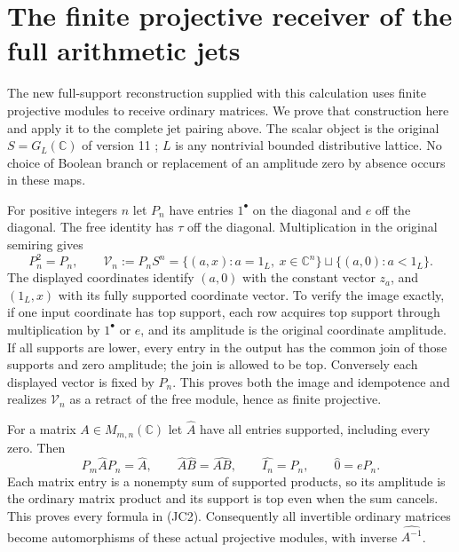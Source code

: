\documentclass[11pt,a4paper]{article}
\theoremstyle{definition}\newtheorem{definition}[theorem]{Definition}
\begin{document}
\section{The finite projective receiver of the full arithmetic jets}
\label{sec:projective-jet-receiver}

The new full-support reconstruction supplied with this calculation uses
finite projective modules to receive ordinary matrices. We prove that
construction here and apply it to the complete jet pairing above.
The scalar object is the original $S=G_L(\mathbb C)$ of version 11
\cite{support}; $L$ is any nontrivial bounded distributive lattice.
No choice of Boolean branch or replacement of an amplitude zero by
absence occurs in these maps.

For positive integers $n$ let $P_n$ have entries $1^\bullet$ on
the diagonal and $e$ off the diagonal. The free identity has $\tau$
off the diagonal. Multiplication in the original semiring gives
\[
 P_n^2=P_n,\qquad
 \mathcal V_n:=P_nS^n
 =\{(a,x):a=1_L,\ x\in\mathbb C^n\}
       \sqcup\{(a,0):a<1_L\}.
 \tag{JC1}
\]
The displayed coordinates identify $(a,0)$ with the constant vector
$z_a$, and $(1_L,x)$ with its fully supported coordinate vector.
To verify the image exactly, if one input coordinate has top support,
each row acquires top support through multiplication by $1^\bullet$
or $e$, and its amplitude is the original coordinate amplitude.
If all supports are lower, every entry in the output has the common
join of those supports and zero amplitude; the join is allowed to
be top. Conversely each displayed vector is fixed by $P_n$.
This proves both the image and idempotence and realizes $\mathcal V_n$
as a retract of the free module, hence as finite projective.

For a matrix $A\in M_{m,n}(\mathbb C)$ let $\widehat A$ have
all entries supported, including every zero. Then
\[
 P_m\widehat A P_n=\widehat A,\qquad
 \widehat A\widehat B=\widehat{AB},\qquad
 \widehat {I_n}=P_n,\qquad \widehat 0=eP_n.
 \tag{JC2}
\]
Each matrix entry is a nonempty sum of supported products, so its
amplitude is the ordinary matrix product and its support is top even
when the sum cancels. This proves every formula in (JC2).
Consequently all invertible ordinary matrices become automorphisms
of these actual projective modules, with inverse $\widehat{A^{-1}}$.
\end{document}
